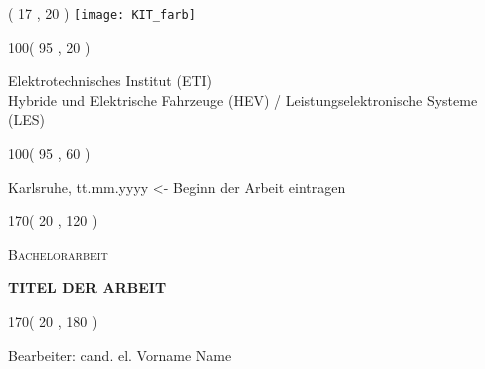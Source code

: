 %
%

\thispagestyle{empty}

\begin{textblock}{50}( 17 , 20 )
\texttt{[image: KIT\_farb]}
\end{textblock}

\begin{textblock}{100}( 95 , 20 )
\begin{flushright}
Elektrotechnisches Institut (ETI)\\
Hybride und Elektrische Fahrzeuge (HEV) / Leistungselektronische Systeme (LES)	%
\end{flushright}
\end{textblock}


\begin{textblock}{100}( 95 , 60 )
\begin{flushright}
\large
Karlsruhe, tt.mm.yyyy <- Beginn der Arbeit eintragen    				          	%
\end{flushright}
\end{textblock}

\begin{textblock}{170}( 20 , 120 )
\begin{center}
    \begin{LARGE}
    \textsc{Bachelorarbeit}\\										%
    \end{LARGE}
\vspace{0.5cm}
    \begin{huge}
    \textbf{TITEL DER ARBEIT}\\[1cm]           									%
    \end{huge}
\end{center}
\end{textblock}

\begin{textblock}{170}( 20 , 180 )
\begin{center}
\large
Bearbeiter: cand. el. Vorname Name \\           									%
\end{center}
\end{textblock}

